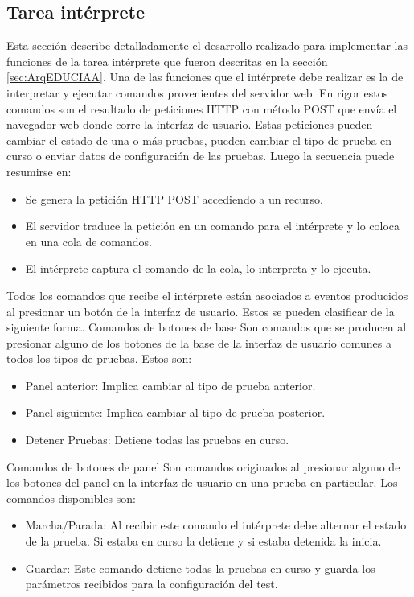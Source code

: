 \subsection{Tarea intérprete}
\label{sec:Interprete}
Esta sección describe detalladamente el desarrollo realizado para implementar las funciones de la tarea intérprete que fueron descritas en la sección \ref{sec:ArqEDUCIAA}.
Una de las funciones que el intérprete debe realizar es la de interpretar y ejecutar comandos provenientes del servidor web. En rigor estos comandos son el resultado de peticiones HTTP con método POST que envía el navegador web donde corre la interfaz de usuario. Estas peticiones pueden cambiar el estado de una o más pruebas, pueden cambiar el tipo de prueba en curso o enviar datos de configuración de las pruebas.
Luego la secuencia puede resumirse en:
\begin{itemize}
	\item Se genera la petición HTTP POST accediendo a un recurso.
	\item El servidor traduce la petición en un comando para el intérprete y lo coloca en una cola de comandos.
	\item El intérprete captura el comando de la cola, lo interpreta y lo ejecuta.
\end{itemize}

Todos los comandos que recibe el intérprete están asociados a eventos producidos al presionar un botón de la interfaz de usuario. Estos se pueden clasificar de la siguiente forma.
Comandos de botones de base
Son comandos que se producen al presionar alguno de los botones de la base de la interfaz de usuario comunes a todos los tipos de pruebas. Estos son:
\begin{itemize}
	\item Panel anterior: Implica cambiar al tipo de prueba anterior.
	\item Panel siguiente: Implica cambiar al tipo de prueba posterior.
	\item Detener Pruebas: Detiene todas las pruebas en curso.
\end{itemize}
Comandos de botones de panel
Son comandos originados al presionar alguno de los botones del panel en la interfaz de usuario en una prueba en particular. Los comandos disponibles son:
\begin{itemize}
	\item Marcha/Parada: Al recibir este comando el intérprete debe alternar el estado de la prueba. Si estaba en curso la detiene y si estaba detenida la inicia.
	\item Guardar: Este comando detiene todas la pruebas en curso y guarda los parámetros recibidos para la configuración del test.	
\end{itemize}

